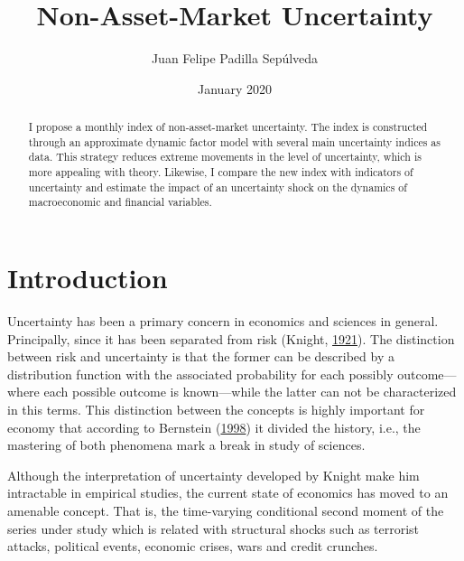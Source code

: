 \documentclass[12pt,twoside]{reedthesis}
\title{Non-Asset-Market Uncertainty}
\author{Juan Felipe Padilla Sepúlveda}
\date{January 2020}
\begin{document}
  \maketitle

\frontmatter %
\pagestyle{empty} %



  \hypersetup{linkcolor=black}
  \setcounter{tocdepth}{2}
  \tableofcontents

  \listoftables

  \listoffigures
  \begin{abstract}
    I propose a monthly index of non-asset-market uncertainty. The index is constructed through an approximate dynamic factor model with several main uncertainty indices as data. This strategy reduces extreme movements in the level of uncertainty, which is more appealing with theory. Likewise, I compare the new index with indicators of uncertainty and estimate the impact of an uncertainty shock on the dynamics of macroeconomic and financial variables.
  \end{abstract}

\mainmatter %
\pagestyle{fancyplain} %

\hypertarget{introduction}{%
\chapter*{Introduction}\label{introduction}}

Uncertainty has been a primary concern in economics and sciences in general. Principally, since it has been separated from risk (Knight, \protect\hyperlink{ref-knight:1921}{1921}). The distinction between risk and uncertainty is that the former can be described by a distribution function with the associated probability for each possibly outcome---where each possible outcome is known---while the latter can not be characterized in this terms. This distinction between the concepts is highly important for economy that according to Bernstein (\protect\hyperlink{ref-bernstein:1998}{1998}) it divided the history, i.e., the mastering of both phenomena mark a break in study of sciences.

Although the interpretation of uncertainty developed by Knight make him intractable in empirical studies, the current state of economics has moved to an amenable concept. That is, the time-varying conditional second moment of the series under study which is related with structural shocks such as terrorist attacks, political events, economic crises, wars and credit crunches.
\end{document}
